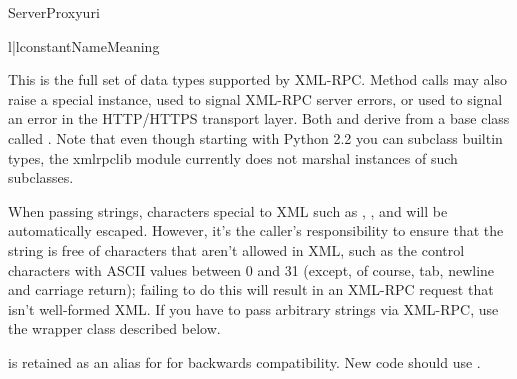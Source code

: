 \begin{classdesc}{ServerProxy}{uri}
\begin{tableii}{l|l}{constant}{Name}{Meaning}
\end{tableii}

This is the full set of data types supported by XML-RPC.  Method calls
may also raise a special  instance, used to signal
XML-RPC server errors, or  used to signal an
error in the HTTP/HTTPS transport layer.  Both  and
 derive from a base class called
.  Note that even though starting with Python 2.2 you
can subclass builtin types, the xmlrpclib module currently does not
marshal instances of such subclasses.

When passing strings, characters special to XML such as \samp{<},
\samp{>}, and \samp{\&} will be automatically escaped.  However, it's
the caller's responsibility to ensure that the string is free of
characters that aren't allowed in XML, such as the control characters
with ASCII values between 0 and 31 (except, of course, tab, newline and
carriage return); failing to do this will result in
an XML-RPC request that isn't well-formed XML.  If you have to pass
arbitrary strings via XML-RPC, use the  wrapper class
described below.

 is retained as an alias for  for backwards
compatibility.  New code should use .

\end{classdesc}


\begin{seealso}
\end{seealso}


